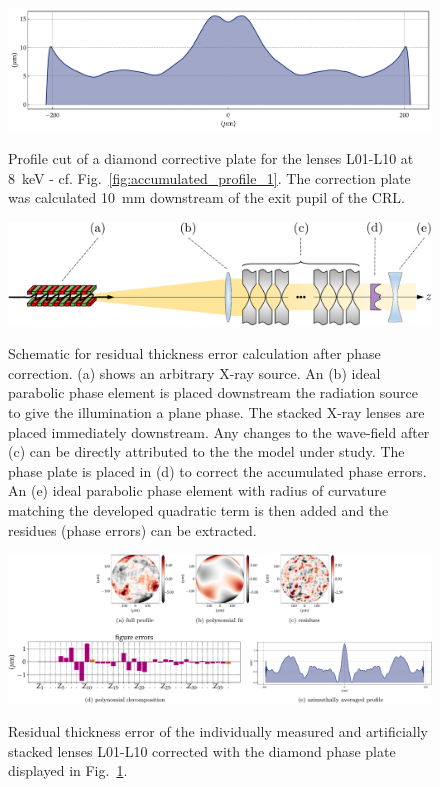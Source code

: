 \begin{refsection}
\begin{figure}[t]
        \centering
        {\includegraphics[width=0.6\linewidth]{figures/ch06/CDn_individual_8p0keV_n_10.0_lsp2p0mm_cpp10p0mm_phase_correction_plate_cut_2.pdf}}
        \caption[Diamond correction plate profile cut]{Profile cut of a diamond corrective plate for the lenses L01-L10 at 8~keV - cf. Fig.~\ref{fig:accumulated_profile_1}. The correction plate was calculated 10~mm downstream of the exit pupil of the CRL.}\label{fig:plate_profile}
\end{figure}

\begin{figure}[t]
        \centering
        {\includegraphics[width=0.6\linewidth]{figures/ch06/recovered_phase_corrected.pdf}}
        \caption[Schematic for residual thickness error calculation after phase correction]{Schematic for residual thickness error calculation after phase correction. (a) shows an arbitrary X-ray source. An (b) ideal parabolic phase element is placed downstream the radiation source to give the illumination a plane phase. The stacked X-ray lenses are placed immediately downstream. Any changes to the wave-field after (c) can be directly attributed to the the model under study. The phase plate is placed in (d) to correct the accumulated phase errors. An (e) ideal parabolic phase element with radius of curvature matching the developed quadratic term is then added and the residues (phase errors) can be extracted.}\label{fig:recovered_phase_corrected}
\end{figure}

\begin{figure}[t]
        \centering
        {\includegraphics[width=1\linewidth]{figures/ch06/residual_profile.pdf}}
        \caption[Residual profile after phase correction]{Residual thickness error of the individually measured and artificially stacked lenses L01-L10 corrected with the diamond phase plate displayed in Fig.~\ref{fig:plate_profile}.}\label{fig:residual_profile}
\end{figure}


\end{refsection}
